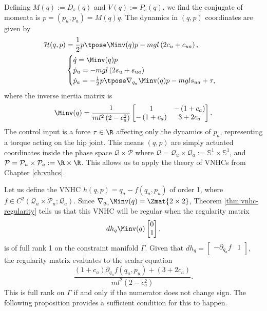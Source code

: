 Defining \(M(q) := D_s(q)\) and \(V(q) := P_s(q)\), we find the conjugate of momenta 
is \(p = (p_u, p_a) = M(q)\dot{q}\).
The dynamics in \((q,p)\) coordinates are given by
\begin{align}\label{eqn:acrobot-hamiltonian}
    \mathcal{H}(q,p) &= \frac{1}{2}p\tpose \Minv(q) p -
    mgl\left(2 c_u + c_{ua}\right)
    , \\
     &\begin{cases}
        \dot{q} = \Minv(q) p \\
        \dot{p}_u = -mgl\left(2s_u + s_{ua}\right) \\
        \dot{p}_a =-\frac{1}{2}p\tpose \nabla_{q_a}\Minv(q) p
        - mgl s_{ua} + \tau,
    \end{cases} \nonumber
\end{align}
where the inverse inertia matrix is
\begin{equation}\label{eqn:Minv}
    \Minv(q) = \frac{1}{ml^2\left(2-c_a^2\right)}
    \begin{bmatrix}
        1 &
        -\left(1+c_a\right) \\
        -\left(1+c_a\right) &
        3+2c_a
    \end{bmatrix}
    .
\end{equation}
The control input is a force \(\tau \in \R\) affecting only the dynamics of
\(p_a\), representing a torque acting on the hip joint.
This means \((q,p)\) are simply actuated coordinates inside the phase space
\(\mathcal{Q} \times \mathcal{P}\) where
\(\mathcal{Q} = \mathcal{Q}_u \times \mathcal{Q}_a 
:= \mathbb{S}^1 \times \mathbb{S}^1\), and
\(\mathcal{P} = \mathcal{P}_u \times \mathcal{P}_a
:= \R \times \R\).
This allows us to apply the theory of VNHCs from Chapter
\ref{ch:vnhcs}.

Let us define the VNHC \(h(q,p) = q_a - f(q_u,p_u)\) of order 1, where
\(f \in C^2\left(\mathcal{Q}_u \times \mathcal{P}_u; \mathcal{Q}_a\right)\).
Since \(\nabla_{q_u}\Minv(q) = \Zmat{2\times 2}\),
Theorem \ref{thm:vnhc-regularity} tells us that this VNHC will be regular
when the regularity matrix
\[
    dh_q \Minv(q) \begin{bmatrix}0 \\ 1 \end{bmatrix}
    ,
\]
is of full rank 1 on the constraint manifold \(\Gamma\).
Given that
\(dh_q = \begin{bmatrix} -\partial_{q_u} f & 1 \end{bmatrix}\),
the regularity matrix evaluates to the scalar equation
\begin{equation}\label{eqn:regularity-matrix-acrobot}
    \frac{(1+c_a)\partial_{q_u}f(q_u,p_u) + (3+2c_a)}{ml^2(2-c_a^2)}
    .
\end{equation}
This is full rank on \(\Gamma\) if and only if the numerator does not
change sign.
The following proposition provides a sufficient condition for this to happen.

